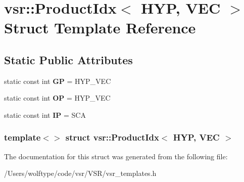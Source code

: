 \hypertarget{structvsr_1_1_product_idx_3_01_h_y_p_00_01_v_e_c_01_4}{\section{vsr\-:\-:Product\-Idx$<$ H\-Y\-P, V\-E\-C $>$ Struct Template Reference}
\label{structvsr_1_1_product_idx_3_01_h_y_p_00_01_v_e_c_01_4}
}
\subsection*{Static Public Attributes}
\begin{DoxyCompactItemize}
\item 
\hypertarget{structvsr_1_1_product_idx_3_01_h_y_p_00_01_v_e_c_01_4_aaec3a818be20dcf85ed89b847d2bdad0}{static const int {\bfseries G\-P} = H\-Y\-P\-\_\-\-V\-E\-C}\label{structvsr_1_1_product_idx_3_01_h_y_p_00_01_v_e_c_01_4_aaec3a818be20dcf85ed89b847d2bdad0}

\item 
\hypertarget{structvsr_1_1_product_idx_3_01_h_y_p_00_01_v_e_c_01_4_a3c2d828197b9cc529e8a2cd03c55a2d2}{static const int {\bfseries O\-P} = H\-Y\-P\-\_\-\-V\-E\-C}\label{structvsr_1_1_product_idx_3_01_h_y_p_00_01_v_e_c_01_4_a3c2d828197b9cc529e8a2cd03c55a2d2}

\item 
\hypertarget{structvsr_1_1_product_idx_3_01_h_y_p_00_01_v_e_c_01_4_a72ccc2dd86916897e8e128fee2d2c074}{static const int {\bfseries I\-P} = S\-C\-A}\label{structvsr_1_1_product_idx_3_01_h_y_p_00_01_v_e_c_01_4_a72ccc2dd86916897e8e128fee2d2c074}

\end{DoxyCompactItemize}
\subsubsection*{template$<$$>$ struct vsr\-::\-Product\-Idx$<$ H\-Y\-P, V\-E\-C $>$}



The documentation for this struct was generated from the following file\-:\begin{DoxyCompactItemize}
\item 
/\-Users/wolftype/code/vsr/\-V\-S\-R/vsr\-\_\-templates.\-h\end{DoxyCompactItemize}
